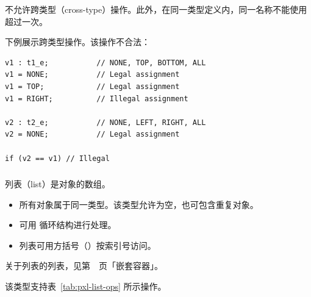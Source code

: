 
不允许跨类型（cross-type）操作。此外，在同一类型定义内，同一名称不能使用超过一次。

下例展示跨类型操作。该操作不合法：
\begin{lstlisting}[style=pxl]
v1 : t1_e;           // NONE, TOP, BOTTOM, ALL
v1 = NONE;           // Legal assignment
v1 = TOP;            // Legal assignment
v1 = RIGHT;          // Illegal assignment

v2 : t2_e;           // NONE, LEFT, RIGHT, ALL
v2 = NONE;           // Legal assignment

if (v2 == v1) // Illegal
\end{lstlisting}

\subsubsection{}

列表（list）是对象的数组。
\begin{itemize}
  \item 所有对象属于同一类型。该类型允许为空，也可包含重复对象。
  \item 可用  循环结构进行处理。
  \item 列表可用方括号（\cmd{[]}）按索引号访问。
\end{itemize}

\begin{seeAlsoBox}
关于列表的列表，见第~\pageref{sec:pxl-nested-containers}~页「嵌套容器」。
\end{seeAlsoBox}

该类型支持表~\ref{tab:pxl-list-ops} 所示操作。

